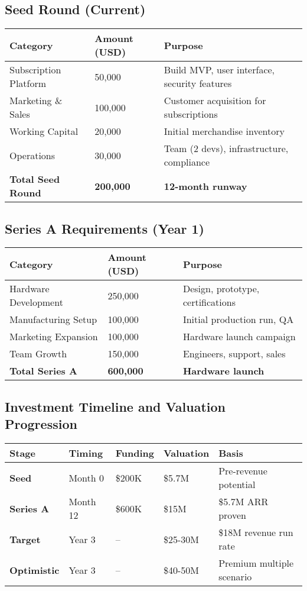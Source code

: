 \documentclass[11pt]{article}
\begin{document}
\subsection{Seed Round (Current)}
\begin{table}[H]
\centering
\begin{tabularx}{\linewidth}{l Y Y}
\toprule
Category & Amount (USD) & Purpose \\\midrule
Subscription Platform & 50,000 & Build MVP, user interface, security features \\
Marketing \& Sales & 100,000 & Customer acquisition for subscriptions \\
Working Capital & 20,000 & Initial merchandise inventory \\
Operations & 30,000 & Team (2 devs), infrastructure, compliance \\
\textbf{Total Seed Round} & \textbf{200,000} & \textbf{12-month runway} \\
\bottomrule
\end{tabularx}
\end{table}

\subsection{Series A Requirements (Year 1)}
\begin{table}[H]
\centering
\begin{tabularx}{\linewidth}{l Y Y}
\toprule
Category & Amount (USD) & Purpose \\\midrule
Hardware Development\cite{ycombinator2022} & 250,000 & Design, prototype, certifications \\
Manufacturing Setup & 100,000 & Initial production run, QA \\
Marketing Expansion & 100,000 & Hardware launch campaign \\
Team Growth & 150,000 & Engineers, support, sales \\
\textbf{Total Series A} & \textbf{600,000} & \textbf{Hardware launch} \\
\bottomrule
\end{tabularx}
\end{table}

\subsection{Investment Timeline and Valuation Progression}
\begin{table}[H]
\centering
\begin{tabularx}{\linewidth}{l Y Y Y Y}
\toprule
Stage & Timing & Funding & Valuation & Basis \\\midrule
\textbf{Seed} & Month 0 & \$200K & \$5.7M & Pre-revenue potential \\
\textbf{Series A} & Month 12 & \$600K & \$15M & \$5.7M ARR proven \\
\textbf{Target} & Year 3 & -- & \$25-30M & \$18M revenue run rate \\
\textbf{Optimistic} & Year 3 & -- & \$40-50M & Premium multiple scenario \\
\bottomrule
\end{tabularx}
\end{table}
\end{document}
